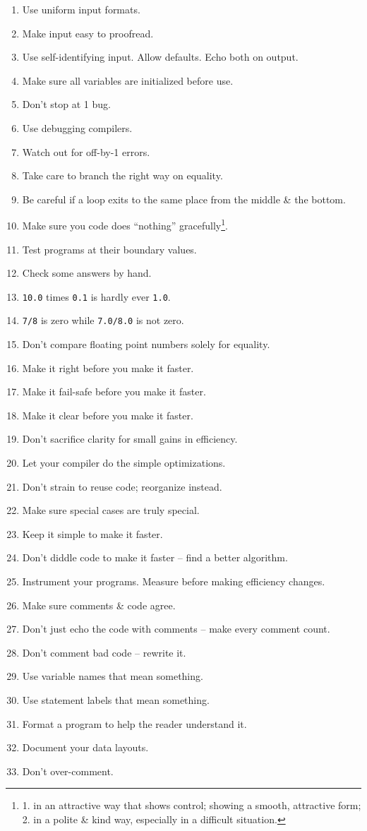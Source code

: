 \documentclass{article}
\begin{document}
\begin{enumerate}
	\item Use uniform input formats.
	\item Make input easy to proofread.
	\item Use self-identifying input. Allow defaults. Echo both on output.
	\item Make sure all variables are initialized before use.
	\item Don't stop at 1 bug.
	\item Use debugging compilers.
	\item Watch out for off-by-1 errors.
	\item Take care to branch the right way on equality.
	\item Be careful if a loop exits to the same place from the middle \& the bottom.
	\item Make sure you code does ``nothing'' gracefully\footnote{1. in an attractive way that shows control; showing a smooth, attractive form; 2. in a polite \& kind way, especially in a difficult situation.}.
	\item Test programs at their boundary values.
	\item Check some answers by hand.
	\item {\tt10.0} times {\tt0.1} is hardly ever {\tt1.0}.
	\item {\tt7/8} is zero while {\tt7.0/8.0} is not zero.
	\item Don't compare floating point numbers solely for equality.
	\item Make it right before you make it faster.
	\item Make it fail-safe before you make it faster.
	\item Make it clear before you make it faster.
	\item Don't sacrifice clarity for small gains in efficiency.
	\item Let your compiler do the simple optimizations.
	\item Don't strain to reuse code; reorganize instead.
	\item Make sure special cases are truly special.
	\item Keep it simple to make it faster.
	\item Don't diddle code to make it faster -- find a better algorithm.
	\item Instrument your programs. Measure before making efficiency changes.
	\item Make sure comments \& code agree.
	\item Don't just echo the code with comments -- make every comment count.
	\item Don't comment bad code -- rewrite it.
	\item Use variable names that mean something.
	\item Use statement labels that mean something.
	\item Format a program to help the reader understand it.
	\item Document your data layouts.
	\item Don't over-comment.
\end{enumerate}
\end{document}
